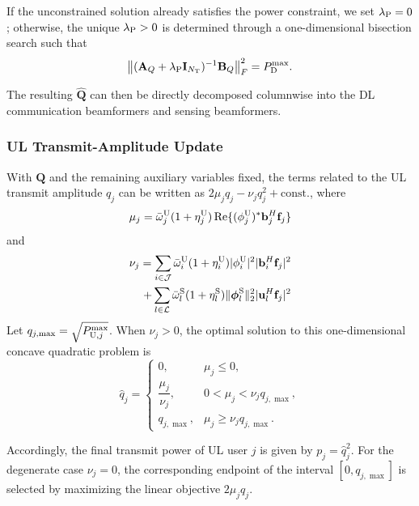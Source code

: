 \documentclass[letterpaper,journal]{IEEEtran}
\begin{document}
If the unconstrained solution already satisfies the power constraint, we set $\lambda_{\rm P}=0$; otherwise, the unique $\lambda_{\rm P}>0$ is determined through a one-dimensional bisection search such that
\begin{equation}
\left\|
(\mathbf A_Q+\lambda_{\rm P}\mathbf I_{N_{\rm T}})^{-1}
\mathbf B_Q
\right\|_F^2
=
P_{\rm D}^{\max}.
\label{eq:Q_power_boundary}
\end{equation}

The resulting $\widehat{\mathbf Q}$ can then be directly decomposed columnwise into the DL communication beamformers and sensing beamformers.

\subsubsection{UL Transmit-Amplitude Update}

With $\mathbf Q$ and the remaining auxiliary variables fixed, the terms related to the UL transmit amplitude $q_j$ can be written as $2\mu_jq_j-\nu_jq_j^2+\text{const.}$, where
\begin{equation}
\begin{aligned}
\mu_j=\bar\omega_j^{\rm U}(1+\eta_j^{\rm U})\operatorname{Re}\{(\phi_j^{\rm U})^*\mathbf b_j^H\mathbf f_j\}
\end{aligned}
\end{equation}
and
\begin{equation}
\begin{aligned}
\nu_j=\sum_{i\in\mathcal J}\bar\omega_i^{\rm U}(1+\eta_i^{\rm U})|\phi_i^{\rm U}|^2|\mathbf b_i^H\mathbf f_j|^2
\\
+
\sum_{l\in\mathcal L}\bar\omega_l^{\rm S}(1+\eta_l^{\rm S})\|\boldsymbol\phi_l^{\rm S}\|_2^2|\mathbf u_l^H\mathbf f_j|^2
\end{aligned}
\end{equation}
Let $q_{j,\max}=\sqrt{P_{{\rm U},j}^{\max}}$. When $\nu_j>0$, the optimal solution to this one-dimensional concave quadratic problem is
\begin{equation}
\widehat q_j
=
\begin{cases}
0,
& \mu_j\le0,\\[1mm]
\dfrac{\mu_j}{\nu_j},
& 0<\mu_j<\nu_jq_{j,\max},\\[2mm]
q_{j,\max},
& \mu_j\ge\nu_jq_{j,\max}.
\end{cases}
\label{eq:q_update}
\end{equation}

Accordingly, the final transmit power of UL user $j$ is given by $p_j=\widehat q_j^2$. For the degenerate case $\nu_j=0$, the corresponding endpoint of the interval $[0,q_{j,\max}]$ is selected by maximizing the linear objective $2\mu_jq_j$.
\end{document}
